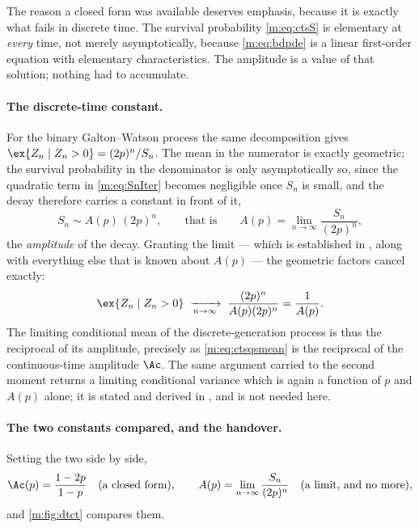 The reason a closed form was available deserves emphasis, because it is exactly
what fails in discrete time. The survival probability \cref{m:eq:ctsS} is elementary
at \emph{every} time, not merely asymptotically, because \cref{m:eq:bdpde} is a
linear first-order equation with elementary characteristics. The amplitude is a
value of that solution; nothing had to accumulate.

\paragraph{The discrete-time constant.}
For the binary Galton--Watson process the same decomposition gives
$\ex{Z_n\mid Z_n>0} = (2p)^n/S_n$. The mean in the numerator is exactly geometric;
the survival probability in the denominator is only asymptotically so, since the
quadratic term in \cref{m:eq:SnIter} becomes negligible once $S_n$ is small, and
the decay therefore carries a constant in front of it,
\begin{equation}
\label{m:eq:Apdef}
S_n\sim A(p)\,(2p)^n,
\qquad\text{that is}\qquad
A(p) = \lim_{n\to\infty}\frac{S_n}{(2p)^n} ,
\end{equation}
the \emph{amplitude} of the decay. Granting the limit --- which is established in
\ChA, along with everything else that is known about $A(p)$ --- the geometric
factors cancel exactly:
\begin{equation}
\label{m:eq:qsmean}
\ex{Z_n\mid Z_n>0}
\;\xrightarrow[n\to\infty]{}\;
\frac{(2p)^n}{A(p)(2p)^n} = \frac{1}{A(p)} .
\end{equation}
The limiting conditional mean of the discrete-generation process is thus the
reciprocal of its amplitude, precisely as \cref{m:eq:ctsqsmean} is the reciprocal
of the continuous-time amplitude $\Ac$. The same argument carried to the second
moment returns a limiting conditional variance which is again a function of $p$
and $A(p)$ alone; it is stated and derived in \ChA, and is not needed here.

\paragraph{The two constants compared, and the handover.}
Setting the two side by side,
\begin{equation}
\label{m:eq:twoconstants}
\Ac(p) = \frac{1-2p}{1-p}\quad\text{(a closed form)},
\qquad
A(p) = \lim_{n\to\infty}\frac{S_n}{(2p)^n}\quad\text{(a limit, and no more)},
\end{equation}
and \cref{m:fig:dtct} compares them.

